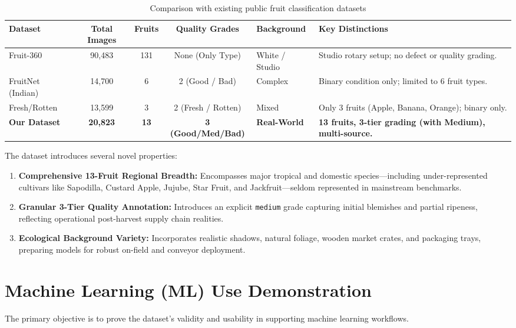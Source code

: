 \documentclass[11pt,a4paper]{article}
\begin{document}
\begin{table}[H]
\centering\small
\begin{tabularx}{\textwidth}{|p{}|c|c|c|p{}|X|}
\hline
\textbf{Dataset} & \textbf{Total Images} & \textbf{Fruits} & \textbf{Quality Grades} & \textbf{Background} & \textbf{Key Distinctions} \\
\hline
Fruit-360 \cite{fruit360} & 90,483 & 131 & None (Only Type) & White / Studio & Studio rotary setup; no defect or quality grading. \\ \hline
FruitNet (Indian) \cite{fruitnet} & 14,700 & 6 & 2 (Good / Bad) & Complex & Binary condition only; limited to 6 fruit types. \\ \hline
Fresh/Rotten \cite{khalil_fresh_rotten} & 13,599 & 3 & 2 (Fresh / Rotten) & Mixed & Only 3 fruits (Apple, Banana, Orange); binary only. \\ \hline
\textbf{Our Dataset} & \textbf{20,823} & \textbf{13} & \textbf{3 (Good/Med/Bad)} & \textbf{Real-World} & \textbf{13 fruits, 3-tier grading (with Medium), multi-source.} \\ \hline
\end{tabularx}
\caption{Comparison with existing public fruit classification datasets}
\label{tab:comparison-existing-datasets}
\end{table}

The dataset introduces several novel properties:
\begin{enumerate}
    \item \textbf{Comprehensive 13-Fruit Regional Breadth:} Encompasses major tropical and domestic species—including under-represented cultivars like Sapodilla, Custard Apple, Jujube, Star Fruit, and Jackfruit—seldom represented in mainstream benchmarks.
    \item \textbf{Granular 3-Tier Quality Annotation:} Introduces an explicit \texttt{medium} grade capturing initial blemishes and partial ripeness, reflecting operational post-harvest supply chain realities.
    \item \textbf{Ecological Background Variety:} Incorporates realistic shadows, natural foliage, wooden market crates, and packaging trays, preparing models for robust on-field and conveyor deployment.
\end{enumerate}

\section{Machine Learning (ML) Use Demonstration}
The primary objective is to prove the dataset's validity and usability in supporting machine learning workflows.
\end{document}
